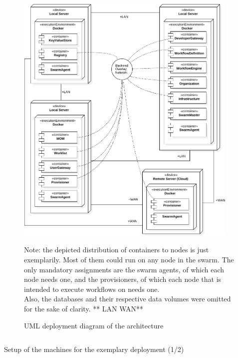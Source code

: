   \begin{figure}[htbp]
    \centering
    \includegraphics[width=0.95\textwidth]{content/images/Architecture-crop.pdf}
    \caption*{\scriptsize Note: the depicted distribution of containers to nodes is just exemplarily. Most of them could run on any node in the swarm. The only mandatory assignments are the swarm agents, of which each node needs one, and the provisioners, of which each node that is intended to execute workflows on needs one. \\ Also, the databases and their respective data volumes were omitted for the sake of clarity. ** LAN WAN**}
    \caption{UML deployment diagram of the architecture}
    \label{fig:deployment_diagram_of_the_architecture}
  \end{figure}

  \begin{listing}[!htbp]
    \inputminted[lastline=47,fontsize=\footnotesize,linenos=true,numberblanklines=true,showspaces=false,breaklines=true,baselinestretch=1]{bash}{../code/_setup/setup_1_environment.sh}
    \caption{Setup of the machines for the exemplary deployment (1/2) }
  \label{lst:setup_exemplary_deployment_1}
  \end{listing}

